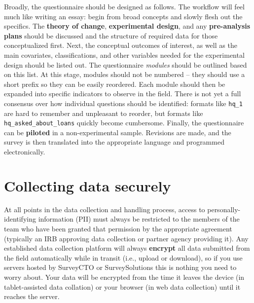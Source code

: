 Broadly, the questionnaire should be designed as follows.
The workflow will feel much like writing an essay:
begin from broad concepts and slowly flesh out the specifics.
The \textbf{theory of change}, \textbf{experimental design},
and any \textbf{pre-analysis plans} should be discussed
and the structure of required data for those conceptualized first.
Next, the conceptual outcomes of interest, as well as the main covariates, classifications,
and other variables needed for the experimental design should be listed out.
The questionnaire \textit{modules} should be outlined based on this list.
At this stage, modules should not be numbered --
they should use a short prefix so they can be easily reordered.
Each module should then be expanded into specific indicators to observe in the field.
There is not yet a full consensus over how individual questions should be identified:
formats like \texttt{hq\_1} are hard to remember and unpleasant to reorder,
but formats like \texttt{hq\_asked\_about\_loans} quickly become cumbersome.
Finally, the questionnaire can be \textbf{piloted}
in a non-experimental sample.
Revisions are made, and the survey is then translated into the appropriate language and programmed electronically.


\section{Collecting data securely}

At all points in the data collection and handling process,
access to personally-identifying information (PII)
must always be restricted to the members of the team
who have been granted that permission by the appropriate agreement
(typically an IRB approving data collection or partner agency providing it).
Any established data collection platform will always \textbf{encrypt}
all data submitted from the field automatically while in transit
(i.e., upload or download), so if you use servers hosted by SurveyCTO
or SurveySolutions this is nothing you need to worry about.
Your data will be encrypted from the time it leaves the device
(in tablet-assisted data collation) or your browser (in web data collection)
until it reaches the server.

